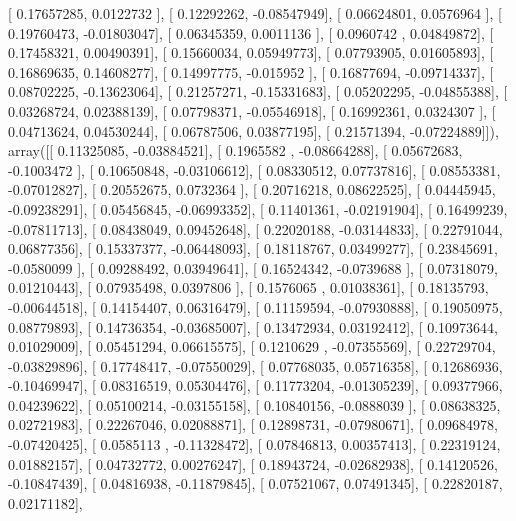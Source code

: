 \documentclass{article}
\begin{document}
       [ 0.17657285,  0.0122732 ],
       [ 0.12292262, -0.08547949],
       [ 0.06624801,  0.0576964 ],
       [ 0.19760473, -0.01803047],
       [ 0.06345359,  0.0011136 ],
       [ 0.0960742 ,  0.04849872],
       [ 0.17458321,  0.00490391],
       [ 0.15660034,  0.05949773],
       [ 0.07793905,  0.01605893],
       [ 0.16869635,  0.14608277],
       [ 0.14997775, -0.015952  ],
       [ 0.16877694, -0.09714337],
       [ 0.08702225, -0.13623064],
       [ 0.21257271, -0.15331683],
       [ 0.05202295, -0.04855388],
       [ 0.03268724,  0.02388139],
       [ 0.07798371, -0.05546918],
       [ 0.16992361,  0.0324307 ],
       [ 0.04713624,  0.04530244],
       [ 0.06787506,  0.03877195],
       [ 0.21571394, -0.07224889]]), array([[ 0.11325085, -0.03884521],
       [ 0.1965582 , -0.08664288],
       [ 0.05672683, -0.1003472 ],
       [ 0.10650848, -0.03106612],
       [ 0.08330512,  0.07737816],
       [ 0.08553381, -0.07012827],
       [ 0.20552675,  0.0732364 ],
       [ 0.20716218,  0.08622525],
       [ 0.04445945, -0.09238291],
       [ 0.05456845, -0.06993352],
       [ 0.11401361, -0.02191904],
       [ 0.16499239, -0.07811713],
       [ 0.08438049,  0.09452648],
       [ 0.22020188, -0.03144833],
       [ 0.22791044,  0.06877356],
       [ 0.15337377, -0.06448093],
       [ 0.18118767,  0.03499277],
       [ 0.23845691, -0.0580099 ],
       [ 0.09288492,  0.03949641],
       [ 0.16524342, -0.0739688 ],
       [ 0.07318079,  0.01210443],
       [ 0.07935498,  0.0397806 ],
       [ 0.1576065 ,  0.01038361],
       [ 0.18135793, -0.00644518],
       [ 0.14154407,  0.06316479],
       [ 0.11159594, -0.07930888],
       [ 0.19050975,  0.08779893],
       [ 0.14736354, -0.03685007],
       [ 0.13472934,  0.03192412],
       [ 0.10973644,  0.01029009],
       [ 0.05451294,  0.06615575],
       [ 0.1210629 , -0.07355569],
       [ 0.22729704, -0.03829896],
       [ 0.17748417, -0.07550029],
       [ 0.07768035,  0.05716358],
       [ 0.12686936, -0.10469947],
       [ 0.08316519,  0.05304476],
       [ 0.11773204, -0.01305239],
       [ 0.09377966,  0.04239622],
       [ 0.05100214, -0.03155158],
       [ 0.10840156, -0.0888039 ],
       [ 0.08638325,  0.02721983],
       [ 0.22267046,  0.02088871],
       [ 0.12898731, -0.07980671],
       [ 0.09684978, -0.07420425],
       [ 0.0585113 , -0.11328472],
       [ 0.07846813,  0.00357413],
       [ 0.22319124,  0.01882157],
       [ 0.04732772,  0.00276247],
       [ 0.18943724, -0.02682938],
       [ 0.14120526, -0.10847439],
       [ 0.04816938, -0.11879845],
       [ 0.07521067,  0.07491345],
       [ 0.22820187,  0.02171182],
\end{document}
